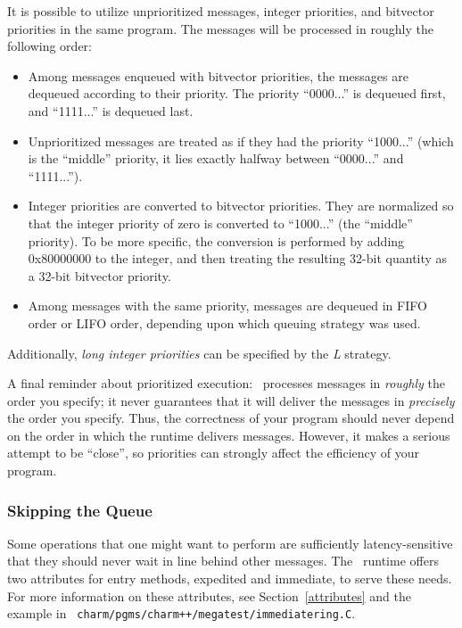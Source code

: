 It is possible to utilize unprioritized messages, integer priorities,
and bitvector priorities in the same program.  The messages will be
processed in roughly the following order:

\begin{itemize}

\item Among messages enqueued with bitvector priorities, the
messages are dequeued according to their priority.  The
priority ``0000...'' is dequeued first, and ``1111...'' is
dequeued last.

\item Unprioritized messages are treated as if they had the
priority ``1000...'' (which is the ``middle'' priority, it
lies exactly halfway between ``0000...'' and ``1111...'').

\item Integer priorities are converted to bitvector priorities.  They
are normalized so that the integer priority of zero is converted to
``1000...'' (the ``middle'' priority).  To be more specific, the
conversion is performed by adding 0x80000000 to the integer, and then
treating the resulting 32-bit quantity as a 32-bit bitvector priority.

\item Among messages with the same priority, messages are
dequeued in FIFO order or LIFO order, depending upon which
queuing strategy was used.

\end{itemize}

Additionally, {\sl long integer priorities} can be specified by the {\em L} strategy. 

A final reminder about prioritized execution: \charmpp\ processes
messages in {\it roughly} the order you specify; it never guarantees
that it will deliver the messages in {\it precisely} the
order you specify. Thus, the correctness
of your program should never depend on the order in which the runtime
delivers messages. However, it makes a serious attempt to be
``close'', so priorities can strongly affect the efficiency of your
program.

\subsubsection{Skipping the Queue}

Some operations that one might want to perform are sufficiently
latency-sensitive that they should never wait in line behind other
messages. The \charmpp\ runtime offers two attributes for entry
methods, {\kw expedited} and {\kw immediate}, to serve these
needs. For more information on these attributes, see
Section~\ref{attributes} and the example in {\tt
  charm/pgms/charm++/megatest/immediatering.C}.
